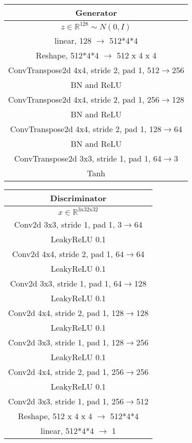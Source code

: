 \documentclass{article}
\begin{document}
\begin{center}
\begin{tabular}{c}
	Generator \\
	\toprule\midrule
	$z \in \mathbb{R}^{128} \sim N(0,I)$ \\
	\midrule
	linear, 128 $\to$ 512*4*4 \\
	\midrule
	Reshape, 512*4*4 $\to$ 512 x 4 x 4 \\
	\midrule
	ConvTranspose2d 4x4, stride 2, pad 1, 512$\to$256 \\
	\midrule
	BN and ReLU \\
	\midrule
	ConvTranspose2d 4x4, stride 2, pad 1, 256$\to$128 \\
	\midrule
	BN and ReLU \\
	\midrule
	ConvTranspose2d 4x4, stride 2, pad 1, 128$\to$64 \\
	\midrule
	BN and ReLU \\
	\midrule
	ConvTranspose2d 3x3, stride 1, pad 1, 64$\to$3 \\
	\midrule
	Tanh \\
	\bottomrule
\end{tabular} 
\end{center}

\begin{center}
\begin{tabular}{c}
	Discriminator \\
	\toprule\midrule
	$x \in \mathbb{R}^{\text{3x32x32}}$ \\
	\midrule
	Conv2d 3x3, stride 1, pad 1, 3$\to$64 \\
	\midrule
	LeakyReLU 0.1 \\
	\midrule
	Conv2d 4x4, stride 2, pad 1, 64$\to$64 \\
	\midrule
	LeakyReLU 0.1 \\
	\midrule
	Conv2d 3x3, stride 1, pad 1, 64$\to$128 \\
	\midrule
	LeakyReLU 0.1 \\
	\midrule
	Conv2d 4x4, stride 2, pad 1, 128$\to$128 \\
	\midrule
	LeakyReLU 0.1 \\
	\midrule
	Conv2d 3x3, stride 1, pad 1, 128$\to$256 \\
	\midrule
	LeakyReLU 0.1 \\
	\midrule
	Conv2d 4x4, stride 2, pad 1, 256$\to$256 \\
	\midrule
	LeakyReLU 0.1 \\
	\midrule
	Conv2d 3x3, stride 1, pad 1, 256$\to$512 \\
	\midrule
	Reshape, 512 x 4 x 4 $\to$ 512*4*4 \\
	\midrule
	linear, 512*4*4 $\to$ 1 \\
	\bottomrule
\end{tabular}
\end{center}
\end{document}

